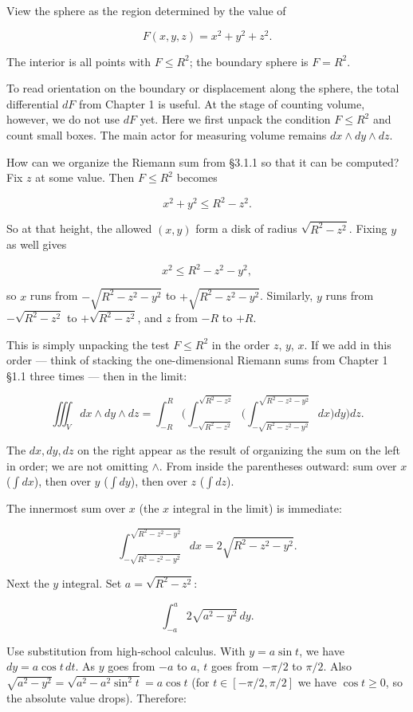 \documentclass[a4paper,12pt,openany]{book}
\begin{document}
View the sphere as the region determined by the value of

\[F(x,y,z)=x^2+y^2+z^2.\]

The interior is all points with \(F\le R^2\); the boundary sphere is
\(F=R^2\).

To read orientation on the boundary or displacement along the sphere,
the total differential \(dF\) from Chapter 1 is useful. At the stage of
counting volume, however, we do not use \(dF\) yet. Here we first unpack
the condition \(F\le R^2\) and count small boxes. The main actor for
measuring volume remains \(dx\wedge dy\wedge dz\).

How can we organize the Riemann sum from §3.1.1 so that it can be
computed? Fix \(z\) at some value. Then \(F\le R^2\) becomes

\[x^2+y^2\le R^2-z^2.\]

So at that height, the allowed \((x,y)\) form a disk of radius
\(\sqrt{R^2-z^2}\). Fixing \(y\) as well gives

\[x^2\le R^2-z^2-y^2,\]

so \(x\) runs from \(-\sqrt{R^2 - z^2 - y^2}\) to
\(+\sqrt{R^2 - z^2 - y^2}\). Similarly, \(y\) runs from
\(-\sqrt{R^2 - z^2}\) to \(+\sqrt{R^2 - z^2}\), and \(z\) from \(-R\) to
\(+R\).

This is simply unpacking the test \(F\le R^2\) in the order \(z\),
\(y\), \(x\). If we add in this order — think of stacking the
one-dimensional Riemann sums from Chapter 1 §1.1 three times — then in
the limit:

\[\iiint_V dx \wedge dy \wedge dz = \int_{-R}^{R} \Biggl( \int_{-\sqrt{R^2 - z^2}}^{\sqrt{R^2 - z^2}} \Biggl( \int_{-\sqrt{R^2 - z^2 - y^2}}^{\sqrt{R^2 - z^2 - y^2}} dx \Biggr) dy \Biggr) dz.\]

The \(dx, dy, dz\) on the right appear as the result of organizing the
sum on the left in order; we are not omitting \(\wedge\). From inside
the parentheses outward: sum over \(x\) (\(\int dx\)), then over \(y\)
(\(\int dy\)), then over \(z\) (\(\int dz\)).

The innermost sum over \(x\) (the \(x\) integral in the limit) is
immediate:

\[\int_{-\sqrt{R^2 - z^2 - y^2}}^{\sqrt{R^2 - z^2 - y^2}} dx = 2\sqrt{R^2 - z^2 - y^2}.\]

Next the \(y\) integral. Set \(a = \sqrt{R^2 - z^2}\):

\[\int_{-a}^{a} 2\sqrt{a^2 - y^2}\,dy.\]

Use substitution from high-school calculus. With \(y = a\sin t\), we
have \(dy = a\cos t\,dt\). As \(y\) goes from \(-a\) to \(a\), \(t\)
goes from \(-\pi/2\) to \(\pi/2\). Also
\(\sqrt{a^2 - y^2} = \sqrt{a^2 - a^2\sin^2 t} = a\cos t\) (for
\(t \in [-\pi/2,\pi/2]\) we have \(\cos t \ge 0\), so the absolute value
drops). Therefore:
\end{document}
